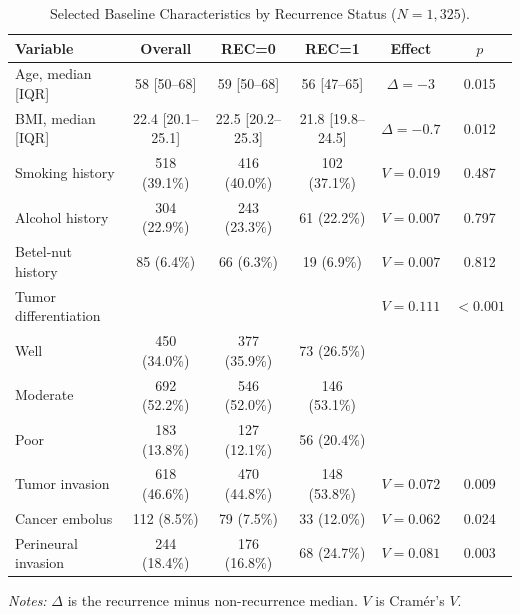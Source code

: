 \documentclass[11pt,a4paper]{article}
\begin{document}
\begin{table}[htbp]

\centering

\small

\setlength{\tabcolsep}{2.5pt}

\caption{Selected Baseline Characteristics by Recurrence Status ($N=1,325$).}

\label{tab:baseline}

\begin{tabular*}{\linewidth}{@{\extracolsep{\fill}}lccccc@{}}

\toprule

\textbf{Variable} & \textbf{Overall} & \textbf{REC=0} & \textbf{REC=1} & \textbf{Effect} & \textbf{$p$} \\

\midrule

Age, median [IQR] & 58 [50--68] & 59 [50--68] & 56 [47--65] & $\Delta=-3$ & 0.015 \\

BMI, median [IQR] & 22.4 [20.1--25.1] & 22.5 [20.2--25.3] & 21.8 [19.8--24.5] & $\Delta=-0.7$ & 0.012 \\

Smoking history & 518 (39.1\%) & 416 (40.0\%) & 102 (37.1\%) & $V=0.019$ & 0.487 \\

Alcohol history & 304 (22.9\%) & 243 (23.3\%) & 61 (22.2\%) & $V=0.007$ & 0.797 \\

Betel-nut history & 85 (6.4\%) & 66 (6.3\%) & 19 (6.9\%) & $V=0.007$ & 0.812 \\

Tumor differentiation & & & & $V=0.111$ & $<0.001$ \\

\quad Well & 450 (34.0\%) & 377 (35.9\%) & 73 (26.5\%) & & \\

\quad Moderate & 692 (52.2\%) & 546 (52.0\%) & 146 (53.1\%) & & \\

\quad Poor & 183 (13.8\%) & 127 (12.1\%) & 56 (20.4\%) & & \\

Tumor invasion & 618 (46.6\%) & 470 (44.8\%) & 148 (53.8\%) & $V=0.072$ & 0.009 \\

Cancer embolus & 112 (8.5\%) & 79 (7.5\%) & 33 (12.0\%) & $V=0.062$ & 0.024 \\

Perineural invasion & 244 (18.4\%) & 176 (16.8\%) & 68 (24.7\%) & $V=0.081$ & 0.003 \\

\bottomrule

\end{tabular*}

\vspace{0.1cm}

\parbox{\linewidth}{\footnotesize \textit{Notes:} $\Delta$ is the recurrence minus non-recurrence median. $V$ is Cram\'er's $V$.}

\end{table}
\end{document}
